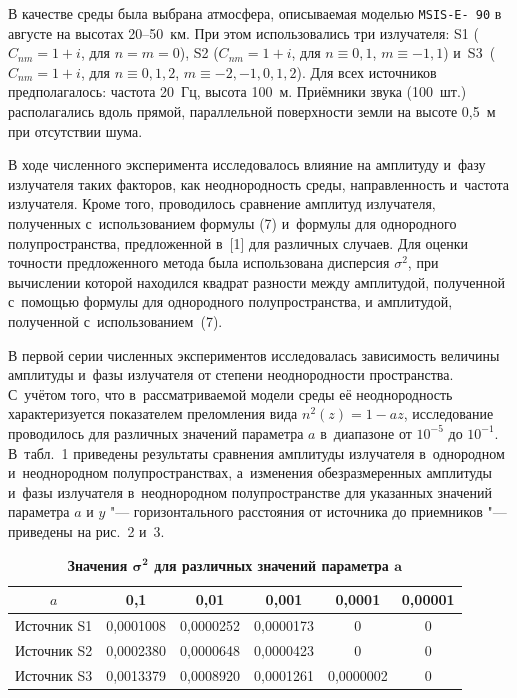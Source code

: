 В качестве среды была выбрана атмосфера,  описываемая моделью
{\tt MSIS-E- 90} в августе на высотах 20--50~км. При этом  использовались три
излучателя: S1 ($C_{nm}=1+i$,  для $n=m=0$),  S2 ($C_{nm}=1+i$,  для
$n\equiv 0, 1$,  $m\equiv -1, 1$) и~S3~($C_{nm}=1+i$,  для
$n\equiv 0, 1, 2$,  $m\equiv -2, -1, 0, 1, 2$).
Для всех источников
предполагалось: частота 20~Гц,  высота 100~м. Приёмники звука (100~шт.)
располагались вдоль прямой,  параллельной поверхности земли на
высоте 0{,}5~м при отсутствии шума.


В ходе численного эксперимента исследовалось влияние на амплитуду
и~фазу излучателя таких факторов,  как неоднородность среды,
направленность и~частота излучателя.
Кроме того, проводилось сравнение амплитуд излучателя,  полученных с~использованием
формулы (7) и~формулы для однородного полупространства,
предложенной в~[1] для различных случаев.
Для оценки точности
предложенного метода была использована дисперсия
$\sigma^{2}$,  при вычислении которой  находился квадрат разности
между амплитудой,  полученной с~помощью формулы для однородного
полупространства, и амплитудой,  полученной с~использованием~(7).

В первой серии численных экспериментов исследовалась зависимость
величины амплитуды и~фазы излучателя от степени неоднородности
пространства. С~учётом того,  что в~рассматриваемой модели среды её
неоднородность характеризуется показателем преломления вида
$n^{2}(z)=1-az$,  исследование проводилось для различных значений
параметра $a$ в~диапазоне от $10^{-5}$ до $10^{-1}$.
В~табл.~1 приведены
результаты сравнения амплитуды излучателя в~однородном
и~неоднородном полупространствах,
а~изменения обезразмеренных амплитуды и~фазы излучателя в~неоднородном
полупространстве для указанных значений параметра $a$ и
$y$  "---  горизонтального расстояния от источника до приемников "---   приведены на рис.~2 и~3.

\begin{table}[h!]
\center
\begin{minipage}[t]{128mm}
\caption{\bf Значения $\boldsymbol {\sigma^{2}}$ для различных значений параметра
$\boldsymbol a$ \vspace{-3mm}}
\begin{tabular}{c|c|c|c|c|c}
\hline
$a$        & 0{,}1       & 0{,}01      & 0{,}001     & 0{,}0001     & 0{,}00001\\
\hline
Источник S1 & 0{,}0001008 & 0{,}0000252 & 0{,}0000173 & 0            & 0\\
Источник S2 & 0{,}0002380 & 0{,}0000648 & 0{,}0000423 & 0            & 0\\
Источник S3 & 0{,}0013379 & 0{,}0008920 & 0{,}0001261 & 0{,}0000002  & 0\\
\hline
\end{tabular}
\end{minipage}
\end{table}


